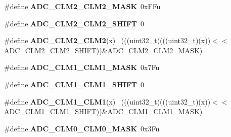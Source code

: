 \begin{DoxyCompactItemize}
\item 
\hypertarget{group___a_d_c___register___masks_ga815d6f1bf2d38384c8fd0dd4f07f7a08}{}\#define {\bfseries A\+D\+C\+\_\+\+C\+L\+M2\+\_\+\+C\+L\+M2\+\_\+\+M\+A\+S\+K}~0x\+F\+Fu\label{group___a_d_c___register___masks_ga815d6f1bf2d38384c8fd0dd4f07f7a08}

\item 
\hypertarget{group___a_d_c___register___masks_ga945ed262c088eecda09d679df33ab193}{}\#define {\bfseries A\+D\+C\+\_\+\+C\+L\+M2\+\_\+\+C\+L\+M2\+\_\+\+S\+H\+I\+F\+T}~0\label{group___a_d_c___register___masks_ga945ed262c088eecda09d679df33ab193}

\item 
\hypertarget{group___a_d_c___register___masks_gaf9fff8bc3bc10df6ad470c1440f527d0}{}\#define {\bfseries A\+D\+C\+\_\+\+C\+L\+M2\+\_\+\+C\+L\+M2}(x)                                              ~(((uint32\+\_\+t)(((uint32\+\_\+t)(x))$<$$<$A\+D\+C\+\_\+\+C\+L\+M2\+\_\+\+C\+L\+M2\+\_\+\+S\+H\+I\+F\+T))\&A\+D\+C\+\_\+\+C\+L\+M2\+\_\+\+C\+L\+M2\+\_\+\+M\+A\+S\+K)\label{group___a_d_c___register___masks_gaf9fff8bc3bc10df6ad470c1440f527d0}

\item 
\hypertarget{group___a_d_c___register___masks_gaf576a4eb27b1478ea37a1b35bf6b869f}{}\#define {\bfseries A\+D\+C\+\_\+\+C\+L\+M1\+\_\+\+C\+L\+M1\+\_\+\+M\+A\+S\+K}~0x7\+Fu\label{group___a_d_c___register___masks_gaf576a4eb27b1478ea37a1b35bf6b869f}

\item 
\hypertarget{group___a_d_c___register___masks_gae83765be6a54aab249c89a0f47afb023}{}\#define {\bfseries A\+D\+C\+\_\+\+C\+L\+M1\+\_\+\+C\+L\+M1\+\_\+\+S\+H\+I\+F\+T}~0\label{group___a_d_c___register___masks_gae83765be6a54aab249c89a0f47afb023}

\item 
\hypertarget{group___a_d_c___register___masks_ga4330bea003d35f36729b166bef5468c6}{}\#define {\bfseries A\+D\+C\+\_\+\+C\+L\+M1\+\_\+\+C\+L\+M1}(x)                                              ~(((uint32\+\_\+t)(((uint32\+\_\+t)(x))$<$$<$A\+D\+C\+\_\+\+C\+L\+M1\+\_\+\+C\+L\+M1\+\_\+\+S\+H\+I\+F\+T))\&A\+D\+C\+\_\+\+C\+L\+M1\+\_\+\+C\+L\+M1\+\_\+\+M\+A\+S\+K)\label{group___a_d_c___register___masks_ga4330bea003d35f36729b166bef5468c6}

\item 
\hypertarget{group___a_d_c___register___masks_ga2f9f36fb3b4eceab2198582865dc5b14}{}\#define {\bfseries A\+D\+C\+\_\+\+C\+L\+M0\+\_\+\+C\+L\+M0\+\_\+\+M\+A\+S\+K}~0x3\+Fu\label{group___a_d_c___register___masks_ga2f9f36fb3b4eceab2198582865dc5b14}


\end{DoxyCompactItemize}
